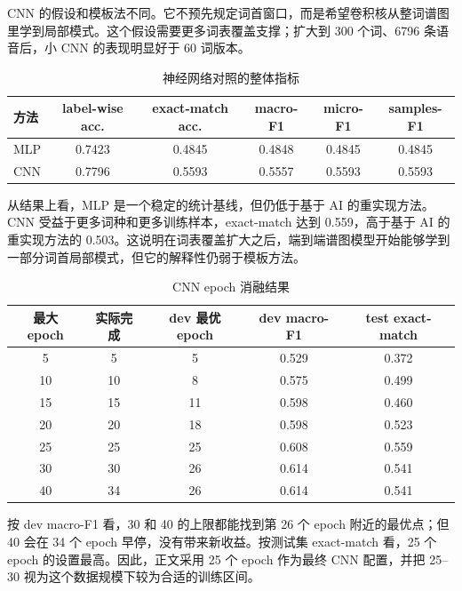 CNN 的假设和模板法不同。它不预先规定词首窗口，而是希望卷积核从整词谱图里学到局部模式。这个假设需要更多词表覆盖支撑；扩大到 300 个词、6796 条语音后，小 CNN 的表现明显好于 60 词版本。

\begin{table}[H]
    \centering
    \caption{神经网络对照的整体指标}
    \label{tab:ai-summary}
    \begin{tabular}{lccccc}
        \toprule
        方法 & label-wise acc. & exact-match acc. & macro-F1 & micro-F1 & samples-F1 \\
        \midrule
        MLP & 0.7423 & 0.4845 & 0.4848 & 0.4845 & 0.4845 \\
        CNN & 0.7796 & 0.5593 & 0.5557 & 0.5593 & 0.5593 \\
        \bottomrule
    \end{tabular}
\end{table}

从结果上看，MLP 是一个稳定的统计基线，但仍低于基于 AI 的重实现方法。CNN 受益于更多词种和更多训练样本，exact-match 达到 0.559，高于基于 AI 的重实现方法的 0.503。这说明在词表覆盖扩大之后，端到端谱图模型开始能够学到一部分词首局部模式，但它的解释性仍弱于模板方法。

\begin{table}[H]
    \centering
    \caption{CNN epoch 消融结果}
    \label{tab:epoch-ablation}
    \begin{tabular}{ccccc}
        \toprule
        最大 epoch & 实际完成 & dev 最优 epoch & dev macro-F1 & test exact-match \\
        \midrule
        5 & 5 & 5 & 0.529 & 0.372 \\
        10 & 10 & 8 & 0.575 & 0.499 \\
        15 & 15 & 11 & 0.598 & 0.460 \\
        20 & 20 & 18 & 0.598 & 0.523 \\
        25 & 25 & 25 & 0.608 & 0.559 \\
        30 & 30 & 26 & 0.614 & 0.541 \\
        40 & 34 & 26 & 0.614 & 0.541 \\
        \bottomrule
    \end{tabular}
\end{table}

按 dev macro-F1 看，30 和 40 的上限都能找到第 26 个 epoch 附近的最优点；但 40 会在 34 个 epoch 早停，没有带来新收益。按测试集 exact-match 看，25 个 epoch 的设置最高。因此，正文采用 25 个 epoch 作为最终 CNN 配置，并把 25--30 视为这个数据规模下较为合适的训练区间。

